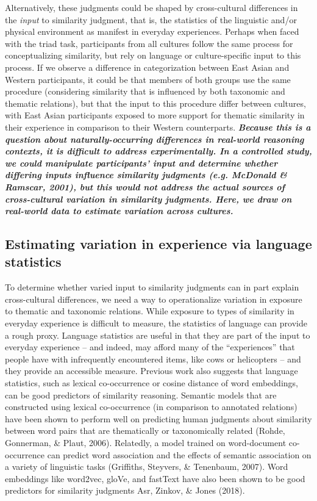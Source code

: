 \documentclass[10pt, letterpaper]{article}
\begin{document}
Alternatively, these judgments could be shaped by cross-cultural
differences in the \emph{input} to similarity judgment, that is, the
statistics of the linguistic and/or physical environment as manifest in
everyday experiences. Perhaps when faced with the triad task,
participants from all cultures follow the same process for
conceptualizing similarity, but rely on language or culture-specific
input to this process. If we observe a difference in categorization
between East Asian and Western participants, it could be that members of
both groups use the same procedure (considering similarity that is
influenced by both taxonomic and thematic relations), but that the input
to this procedure differ between cultures, with East Asian participants
exposed to more support for thematic similarity in their experience in
comparison to their Western counterparts. \textbf{\emph{Because this is
a question about naturally-occurring differences in real-world reasoning
contexts, it is difficult to address experimentally. In a controlled
study, we could manipulate participants' input and determine whether
differing inputs influence similarity judgments (e.g. McDonald \&
Ramscar, 2001), but this would not address the actual sources of
cross-cultural variation in similarity judgments. Here, we draw on
real-world data to estimate variation across cultures.}}

\hypertarget{estimating-variation-in-experience-via-language-statistics}{%
\subsection{Estimating variation in experience via language
statistics}\label{estimating-variation-in-experience-via-language-statistics}}

To determine whether varied input to similarity judgments can in part
explain cross-cultural differences, we need a way to operationalize
variation in exposure to thematic and taxonomic relations. While
exposure to types of similarity in everyday experience is difficult to
measure, the statistics of language can provide a rough proxy. Language
statistics are useful in that they are part of the input to everyday
experience -- and indeed, may afford many of the ``experiences'' that
people have with infrequently encountered items, like cows or
helicopters -- and they provide an accessible measure. Previous work
also suggests that language statistics, such as lexical co-occurrence or
cosine distance of word embeddings, can be good predictors of similarity
reasoning. Semantic models that are constructed using lexical
co-occurrence (in comparison to annotated relations) have been shown to
perform well on predicting human judgments about similarity between word
pairs that are thematically or taxonomically related (Rohde, Gonnerman,
\& Plaut, 2006). Relatedly, a model trained on word-document
co-occurrence can predict word association and the effects of semantic
association on a variety of linguistic tasks (Griffiths, Steyvers, \&
Tenenbaum, 2007). Word embeddings like word2vec, gloVe, and fastText
have also been shown to be good predictors for similarity judgments Asr,
Zinkov, \& Jones (2018).
\end{document}
